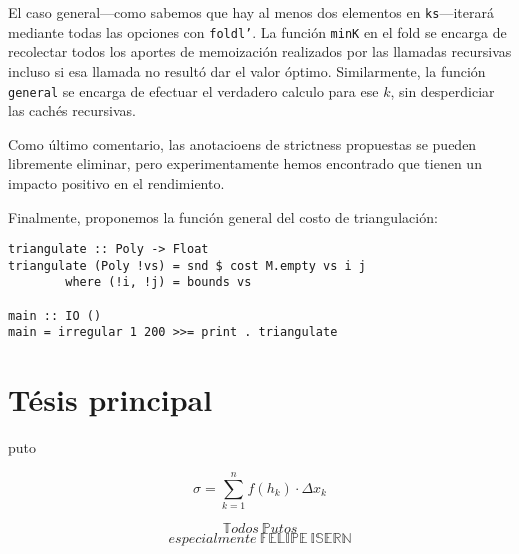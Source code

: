 \documentclass[tiny]{corsage}
\theoremstyle{plain}
\theoremstyle{definition}
\begin{document}
	El caso general---como sabemos que hay al menos dos elementos en \texttt{ks}---iterará mediante todas las opciones con \texttt{foldl'}.  La función \texttt{minK} en el fold se encarga de recolectar todos los aportes de memoización realizados por las llamadas recursivas incluso si esa llamada no resultó dar el valor óptimo.  Similarmente, la función \texttt{general} se encarga de efectuar el verdadero calculo para ese $k$, sin desperdiciar las cachés recursivas.

	Como último comentario, las anotacioens de strictness propuestas se pueden libremente eliminar, pero experimentamente hemos encontrado que tienen un impacto positivo en el rendimiento.

	Finalmente, proponemos la función general del costo de triangulación:

	\begin{verbatim}
triangulate :: Poly -> Float
triangulate (Poly !vs) = snd $ cost M.empty vs i j
        where (!i, !j) = bounds vs

main :: IO ()
main = irregular 1 200 >>= print . triangulate
	\end{verbatim}

\section{Tésis principal}
	puto

	\[ \sigma = \sum_{k = 1}^n{f(h_k) \cdot \Delta x_k} \]

	\[ \mathbb{T}odos\ \mathbb{P}utos \] 
	\[ especialmente\ \mathbb{FELIPE\ ISERN} \]
\end{document}
